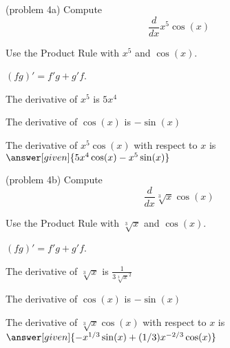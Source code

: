 \documentclass{ximera}
\begin{document}
\begin{center}
\begin{foldable}
\end{foldable}
\end{center}


\begin{problem}(problem 4a)
  Compute
  \[
  \frac{d}{dx} x^5\cos(x)
  \]
  
    \begin{hint}
      Use the Product Rule with $x^5$ and $\cos(x)$.
    \end{hint}
    \begin{hint}
      $(fg)' = f'g+g'f$.
    \end{hint}
    \begin{hint}
      The derivative of $x^5$ is $5x^4$
    \end{hint}
    \begin{hint}
      The derivative of $\cos(x)$ is $-\sin(x)$
    \end{hint}
    
		The derivative of $x^5\cos(x)$ with respect to $x$ is
		 $\answer[given]{5x^4\cos(x) - x^5\sin(x)}$
		
\end{problem}



\begin{problem}(problem 4b)
  Compute
  \[
  \frac{d}{dx} \sqrt[3]x \cos(x)
  \]
  
    \begin{hint}
      Use the Product Rule with $\sqrt[3] x$ and $\cos(x)$.
    \end{hint}
    \begin{hint}
      $(fg)' = f'g+g'f$.
    \end{hint}
    \begin{hint}
      The derivative of $\sqrt[3]x$ is $\frac{1}{3\sqrt[3]x^2}$
    \end{hint}
    \begin{hint}
      The derivative of $\cos(x)$ is $-\sin(x)$
    \end{hint}
    
		The derivative of $\sqrt[3]x\cos(x)$ with respect to $x$ is
		 $\answer[given]{-x^{1/3}\sin(x) + (1/3)x^{-2/3}\cos(x)}$
		
\end{problem}
\end{document}
